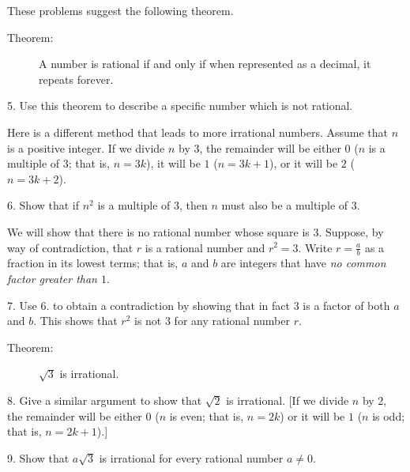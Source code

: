 \documentclass{article}
\newcommand{\0}{\mathbf 0}
\newcommand{\1}{\mathbf 1}
\begin{document}
These problems suggest the following theorem.

\begin{description}
  \item[Theorem:] A number is rational if and only if when represented as a decimal, it repeats forever.
\end{description}

\begin{description}
  \item{5.} Use this theorem to describe a specific number which is not rational.
\end{description}

Here is a different method that leads to more irrational numbers. Assume that $n$ is a positive integer. If we divide $n$ by $3$, the remainder will be either $0$ ($n$ is a multiple of $3$; that is, $n = 3k$), it will be $1$ ($n = 3k+1$), or it will be $2$ ($n = 3k+2$).
\begin{description}
  \item{6.} Show that if $n^2$ is a multiple of $3$, then $n$ must also be a multiple of $3$.
\end{description}

We will show that there is no rational number whose square is $3$. Suppose, by way of contradiction, that $r$ is a rational number and $r^2 = 3$. Write $r = \frac{a}{b}$ as a fraction in its lowest terms; that is, $a$ and $b$ are integers that have \emph{no common factor greater than $1$}.

\begin{description}
  \item{7.} Use 6. to obtain a contradiction by showing that in fact $3$ is a factor of both $a$ and $b$. This shows that $r^2$ is not $3$ for any rational number $r$.
\end{description}

\begin{description}
  \item[Theorem:] $\sqrt{3}$ is irrational.
\end{description}

\begin{description}
  \item{8.} Give a similar argument to show that $\sqrt{2}$ is irrational. [If we divide $n$ by $2$, the remainder will be either $0$ ($n$ is even; that is, $n = 2k$) or it will be $1$ ($n$ is odd; that is, $n = 2k+1$).] 
  \item{9.} Show that $a \sqrt{3}$ is irrational for every rational number $a \neq 0$.
\end{description}
\end{document}
